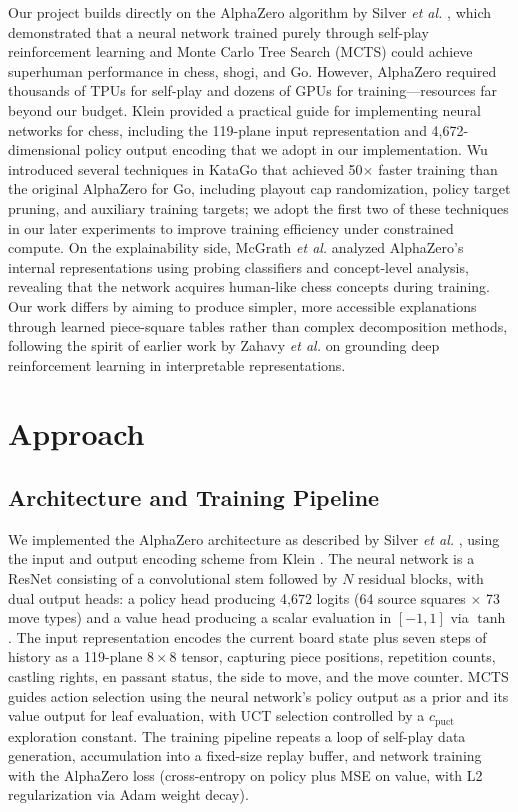 \documentclass{article}
\begin{document}
Our project builds directly on the AlphaZero algorithm by Silver \emph{et al.} \cite{silver2017mastering}, which demonstrated that a neural network trained purely through self-play reinforcement learning and Monte Carlo Tree Search (MCTS) could achieve superhuman performance in chess, shogi, and Go. However, AlphaZero required thousands of TPUs for self-play and dozens of GPUs for training---resources far beyond our budget. Klein \cite{Klein2022} provided a practical guide for implementing neural networks for chess, including the 119-plane input representation and 4,672-dimensional policy output encoding that we adopt in our implementation. Wu \cite{wu2019accelerating} introduced several techniques in KataGo that achieved 50$\times$ faster training than the original AlphaZero for Go, including playout cap randomization, policy target pruning, and auxiliary training targets; we adopt the first two of these techniques in our later experiments to improve training efficiency under constrained compute. On the explainability side, McGrath \emph{et al.} \cite{mcgrath2022acquisition} analyzed AlphaZero's internal representations using probing classifiers and concept-level analysis, revealing that the network acquires human-like chess concepts during training. Our work differs by aiming to produce simpler, more accessible explanations through learned piece-square tables rather than complex decomposition methods, following the spirit of earlier work by Zahavy \emph{et al.} \cite{DBLP:journals/corr/ZahavyBM16} on grounding deep reinforcement learning in interpretable representations.

\section{Approach}
\label{sec:approach}

\subsection{Architecture and Training Pipeline}

We implemented the AlphaZero architecture as described by Silver \emph{et al.} \cite{silver2017mastering}, using the input and output encoding scheme from Klein \cite{Klein2022}. The neural network is a ResNet consisting of a convolutional stem followed by $N$ residual blocks, with dual output heads: a policy head producing 4,672 logits (64 source squares $\times$ 73 move types) and a value head producing a scalar evaluation in $[-1, 1]$ via $\tanh$. The input representation encodes the current board state plus seven steps of history as a 119-plane $8 \times 8$ tensor, capturing piece positions, repetition counts, castling rights, en passant status, the side to move, and the move counter. MCTS guides action selection using the neural network's policy output as a prior and its value output for leaf evaluation, with UCT selection controlled by a $c_{\text{puct}}$ exploration constant. The training pipeline repeats a loop of self-play data generation, accumulation into a fixed-size replay buffer, and network training with the AlphaZero loss (cross-entropy on policy plus MSE on value, with L2 regularization via Adam weight decay).
\end{document}
